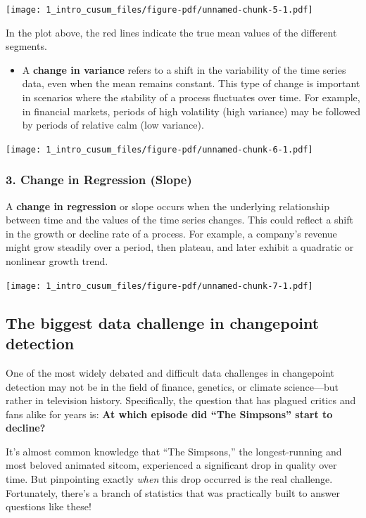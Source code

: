 \documentclass[
  letterpaper,
  DIV=11,
  numbers=noendperiod]{scrreprt}
\providecommand{\tightlist}{%
  \setlength{\itemsep}{0pt}\setlength{\parskip}{0pt}}\usepackage{longtable,booktabs,array}
\begin{document}
\texttt{[image: 1\_intro\_cusum\_files/figure-pdf/unnamed-chunk-5-1.pdf]}

In the plot above, the red lines indicate the true mean values of the
different segments.

\begin{itemize}
\tightlist
\item
  A \textbf{change in variance} refers to a shift in the variability of
  the time series data, even when the mean remains constant. This type
  of change is important in scenarios where the stability of a process
  fluctuates over time. For example, in financial markets, periods of
  high volatility (high variance) may be followed by periods of relative
  calm (low variance).
\end{itemize}

\texttt{[image: 1\_intro\_cusum\_files/figure-pdf/unnamed-chunk-6-1.pdf]}

\subsubsection{3. Change in Regression
(Slope)}\label{change-in-regression-slope}

A \textbf{change in regression} or slope occurs when the underlying
relationship between time and the values of the time series changes.
This could reflect a shift in the growth or decline rate of a process.
For example, a company's revenue might grow steadily over a period, then
plateau, and later exhibit a quadratic or nonlinear growth trend.

\texttt{[image: 1\_intro\_cusum\_files/figure-pdf/unnamed-chunk-7-1.pdf]}

\subsection{The biggest data challenge in changepoint
detection}\label{the-biggest-data-challenge-in-changepoint-detection}

One of the most widely debated and difficult data challenges in
changepoint detection may not be in the field of finance, genetics, or
climate science---but rather in television history. Specifically, the
question that has plagued critics and fans alike for years is:
\textbf{At which episode did ``The Simpsons'' start to decline?}

It's almost common knowledge that ``The Simpsons,'' the longest-running
and most beloved animated sitcom, experienced a significant drop in
quality over time. But pinpointing exactly \emph{when} this drop
occurred is the real challenge. Fortunately, there's a branch of
statistics that was practically built to answer questions like these!
\end{document}

